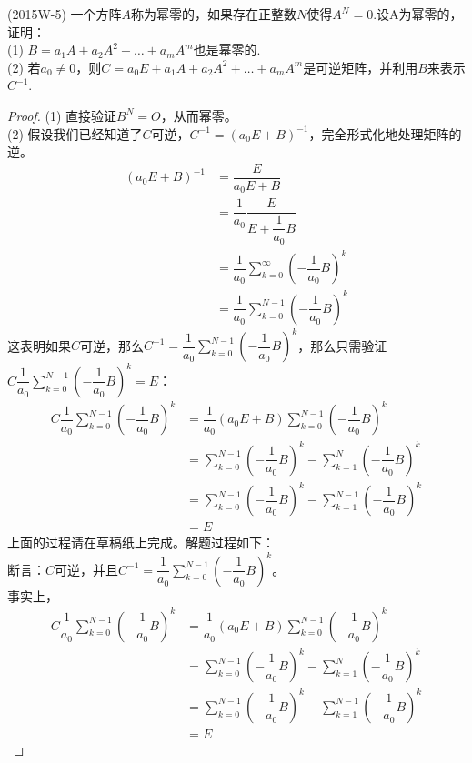 \documentclass[lang=cn,newtx,10pt,scheme=chinese]{elegantbook}
\begin{document}
\begin{example}
    (2015W-5) 一个方阵$A$称为幂零的，如果存在正整数$N$使得$A^N=0$.设A为幂零的，证明：\\
    (1) $B = a_1 A + a_2 A^2 + \dots + a_m A^m$也是幂零的.\\
    (2) 若$a_0 \neq 0$，则$C = a_0 E + a_1 A + a_2 A^2 + \dots + a_m A^m$是可逆矩阵，并利用$B$来表示$C^{-1}$.
\end{example}

\begin{proof}
    (1) 直接验证$B^N = O$，从而幂零。\\
    (2) 假设我们已经知道了$C$可逆，$C^{-1} = (a_0 E + B)^{-1}$，完全形式化地处理矩阵的逆。
    \begin{align*}
        (a_0 E + B)^{-1} &= \dfrac{E}{a_0 E + B} \\
        &= \dfrac{1}{a_0} \dfrac{E}{E + \dfrac{1}{a_0} B} \\
        &= \dfrac{1}{a_0} \sum_{k=0}^{\infty} \left(-\dfrac{1}{a_0} B\right)^k \\
        &= \dfrac{1}{a_0} \sum_{k=0}^{N-1} \left(-\dfrac{1}{a_0} B\right)^k
    \end{align*}
    这表明如果$C$可逆，那么$C^{-1} = \dfrac{1}{a_0} \sum_{k=0}^{N-1} \left(-\dfrac{1}{a_0} B\right)^k$，那么只需验证$C \dfrac{1}{a_0} \sum_{k=0}^{N-1} \left(-\dfrac{1}{a_0} B\right)^k = E$：
    \begin{align*}
        C \dfrac{1}{a_0} \sum_{k=0}^{N-1} \left(-\dfrac{1}{a_0} B\right)^k &= \dfrac{1}{a_0}  (a_0 E + B) \sum_{k=0}^{N-1} \left(-\dfrac{1}{a_0} B\right)^k \\
        &= \sum_{k=0}^{N-1} \left(-\dfrac{1}{a_0} B\right)^k - \sum_{k=1}^{N} \left(-\dfrac{1}{a_0} B\right)^k \\
        &= \sum_{k=0}^{N-1} \left(-\dfrac{1}{a_0} B\right)^k - \sum_{k=1}^{N-1} \left(-\dfrac{1}{a_0} B\right)^k \\
        &= E
    \end{align*}
    上面的过程请在草稿纸上完成。解题过程如下：\\
    断言：$C$可逆，并且$C^{-1} = \dfrac{1}{a_0} \sum_{k=0}^{N-1} \left(-\dfrac{1}{a_0} B\right)^k$。\\
    事实上，
    \begin{align*}
        C \dfrac{1}{a_0} \sum_{k=0}^{N-1} \left(-\dfrac{1}{a_0} B\right)^k &= \dfrac{1}{a_0}  (a_0 E + B) \sum_{k=0}^{N-1} \left(-\dfrac{1}{a_0} B\right)^k \\
        &= \sum_{k=0}^{N-1} \left(-\dfrac{1}{a_0} B\right)^k - \sum_{k=1}^{N} \left(-\dfrac{1}{a_0} B\right)^k \\
        &= \sum_{k=0}^{N-1} \left(-\dfrac{1}{a_0} B\right)^k - \sum_{k=1}^{N-1} \left(-\dfrac{1}{a_0} B\right)^k \\
        &= E
    \end{align*}
\end{proof}
\end{document}
